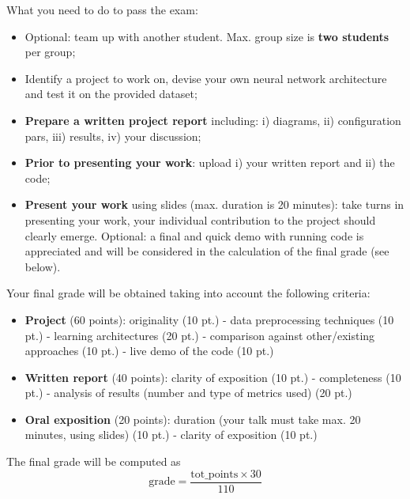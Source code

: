 \documentclass[10pt, conference, letterpaper]{IEEEtran}
\begin{document}
What you need to do to pass the exam:
\begin{itemize}
\item Optional: team up with another student. Max. group size is \textbf{two students} per group;
\item Identify a project to work on, devise your own neural network architecture and test it on the provided dataset;
\item \textbf{Prepare a written project report} including: i) diagrams, ii) configuration pars, iii) results, iv) your discussion;
\item \textbf{Prior to presenting your work}: upload i) your written report and ii) the code;
\item \textbf{Present your work} using slides (max. duration is 20 minutes): take turns in presenting your work, your individual contribution to the project should clearly emerge. Optional: a final and quick demo with running code is appreciated and will be considered in the calculation of the final grade (see below). 
\end{itemize}

Your final grade will be obtained taking into account the following criteria:
\begin{itemize} 
\item \textbf{Project} (60 points): originality (10 pt.) - data preprocessing techniques (10 pt.) - learning architectures (20 pt.) - comparison against other/existing approaches (10 pt.) - live demo of the code (10 pt.)
\item \textbf{Written report} (40 points): clarity of exposition (10 pt.) - completeness (10 pt.) - analysis of results (number and type of metrics used) (20 pt.)
\item \textbf{Oral exposition} (20 points): duration (your talk must take max. 20 minutes, using slides) (10 pt.) - clarity of exposition (10 pt.)
\end{itemize}

The final grade will be computed as
\begin{equation}
\textrm{grade} = \frac{\textrm{tot\_points} \times 30}{110}
\end{equation}



\end{document}

